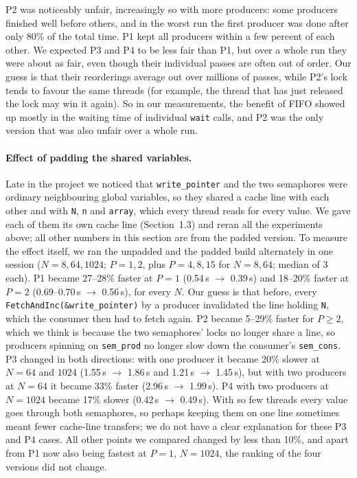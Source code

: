 P2 was noticeably unfair, increasingly so with more producers: some producers finished well before others, and in the worst run the first producer was done after only 80\% of the total time.
P1 kept all producers within a few percent of each other. We expected P3 and P4 to be less fair than P1, but over a whole run they were about as fair, even though their individual passes are often out of order.
Our guess is that their reorderings average out over millions of passes, while P2's lock tends to favour the same threads (for example, the thread that has just released the lock may win it again).
So in our measurements, the benefit of FIFO showed up mostly in the waiting time of individual \texttt{wait} calls, and P2 was the only version that was also unfair over a whole run.

\paragraph{Effect of padding the shared variables.}
Late in the project we noticed that \texttt{write\_pointer} and the two semaphores were ordinary neighbouring global variables, so they shared a cache line with each other
and with \texttt{N}, \texttt{n} and \texttt{array}, which every thread reads for every value. We gave each of them its own cache line (Section~1.3) and reran all the experiments
above; all other numbers in this section are from the padded version. To measure the effect itself, we ran the unpadded and the padded build alternately in one session
($N = 8, 64, 1024$; $P = 1, 2$, plus $P = 4, 8, 15$ for $N = 8, 64$; median of 3 each).
P1 became 27--28\% faster at $P=1$ (0.54\,s $\to$ 0.39\,s) and 18--20\% faster at $P=2$ (0.69--0.70\,s $\to$ 0.56\,s), for every $N$.
Our guess is that before, every \texttt{FetchAndInc(\&write\_pointer)} by a producer invalidated the line holding \texttt{N}, which the consumer then had to fetch again.
P2 became 5--29\% faster for $P \ge 2$, which we think is because the two semaphores' locks no longer share a line, so producers spinning on \texttt{sem\_prod}
no longer slow down the consumer's \texttt{sem\_cons}. P3 changed in both directions: with one producer it became 20\% slower at $N = 64$ and $1024$
(1.55\,s $\to$ 1.86\,s and 1.21\,s $\to$ 1.45\,s), but with two producers at $N=64$ it became 33\% faster (2.96\,s $\to$ 1.99\,s). P4 with two producers at $N=1024$
became 17\% slower (0.42\,s $\to$ 0.49\,s). With so few threads every value goes through both semaphores, so perhaps keeping them on one line sometimes meant fewer
cache-line transfers; we do not have a clear explanation for these P3 and P4 cases. All other points we compared changed by less than 10\%, and apart from P1 now also being
fastest at $P=1$, $N=1024$, the ranking of the four versions did not change.
